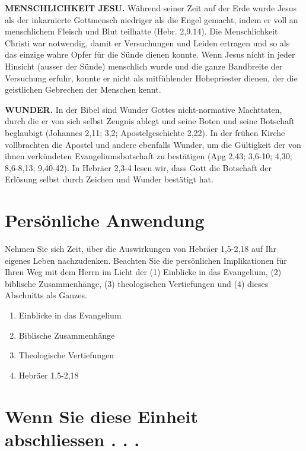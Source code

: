 \documentclass[headsepline=true]{book}
\providecommand{\tightlist}{%
  \setlength{\itemsep}{0pt}\setlength{\parskip}{0pt}}
\begin{document}
\textbf{MENSCHLICHKEIT JESU.} Während seiner Zeit auf der Erde wurde
Jesus als der inkarnierte Gottmensch niedriger als die Engel gemacht,
indem er voll an menschlichem Fleisch und Blut teilhatte (Hebr. 2,9.14).
Die Menschlichkeit Christi war notwendig, damit er Versuchungen und
Leiden ertragen und so als das einzige wahre Opfer für die Sünde dienen
konnte. Wenn Jesus nicht in jeder Hinsicht (ausser der Sünde) menschlich
wurde und die ganze Bandbreite der Versuchung erfuhr, konnte er nicht
als mitfühlender Hohepriester dienen, der die geistlichen Gebrechen der
Menschen kennt.

\textbf{WUNDER.} In der Bibel sind Wunder Gottes nicht-normative
Machttaten, durch die er von sich selbst Zeugnis ablegt und seine Boten
und seine Botschaft beglaubigt (Johannes 2,11; 3,2; Apostelgeschichte
2,22). In der frühen Kirche vollbrachten die Apostel und andere
ebenfalls Wunder, um die Gültigkeit der von ihnen verkündeten
Evangeliumsbotschaft zu bestätigen (Apg 2,43; 3,6-10; 4,30; 8,6-8,13;
9,40-42). In Hebräer 2,3-4 lesen wir, dass Gott die Botschaft der
Erlösung selbst durch Zeichen und Wunder bestätigt hat.

\section{Persönliche Anwendung}\label{persuxf6nliche-anwendung-1}

Nehmen Sie sich Zeit, über die Auswirkungen von Hebräer 1,5-2,18 auf Ihr
eigenes Leben nachzudenken. Beachten Sie die persönlichen Implikationen
für Ihren Weg mit dem Herrn im Licht der (1) Einblicke in das
Evangelium, (2) biblische Zusammenhänge, (3) theologischen Vertiefungen
und (4) dieses Abschnitts als Ganzes.

\begin{enumerate}
\def\labelenumi{\arabic{enumi}.}
\tightlist
\item
  Einblicke in das Evangelium
\item
  Biblische Zusammenhänge
\item
  Theologische Vertiefungen
\item
  Hebräer 1,5-2,18
\end{enumerate}

\section{Wenn Sie diese Einheit abschliessen . .
.}\label{wenn-sie-diese-einheit-abschliessen-.-.-.-1}
\end{document}
